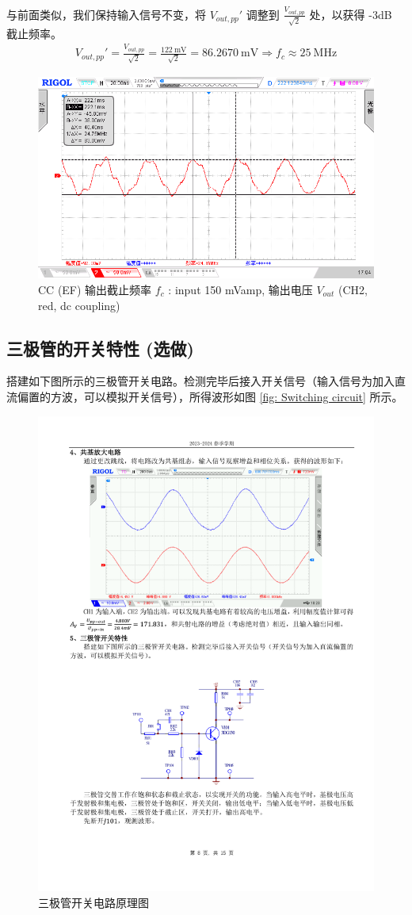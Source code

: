 \documentclass[UTF8]{article}
\begin{document}
与前面类似，我们保持输入信号不变，将 $V_{out,pp}'$ 调整到 $ \frac{V_{out,pp}}{\sqrt{2}}$ 处，以获得 -3dB 截止频率。
\begin{gather}
    V_{out,pp}' = \frac{V_{out,pp}}{\sqrt{2}} = \frac{122 \ \mathrm{mV}}{\sqrt{2}} = 86.2670 \ \mathrm{mV}
    \Longrightarrow 
    f_c \approx 25 \ \mathrm{MHz}
\end{gather}

\begin{figure}[H]\centering
    \includegraphics[width=\columnwidth]{LCE-02-三极管/assets/CC 3dB 截止频率.png}
    \caption{CC (EF) 输出截止频率 $f_c$ :  input 150 mVamp, 输出电压 $V_{out}$ (CH2, red, dc coupling)}
\end{figure}

\subsection{三极管的开关特性 (选做)}

搭建如下图所示的三极管开关电路。检测完毕后接入开关信号（输入信号为加入直流偏置的方波，可以模拟开关信号），所得波形如图 \ref{fig: Switching circuit} 所示。

\begin{figure}[H]\centering
    \includegraphics[width=0.5\columnwidth]{LCE-02-三极管/assets/开关电路电路图.pdf}
    \caption{三极管开关电路原理图}
\end{figure}
\end{document}
